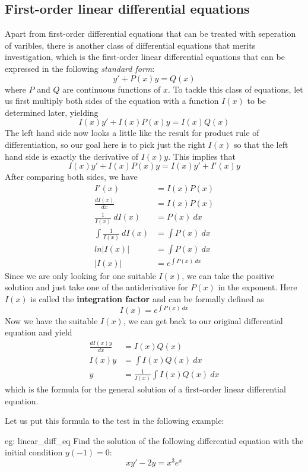 \subsection{First-order linear differential equations}
Apart from first-order differential equations that can be treated with seperation of varibles, there is another class of differential equations that merits investigation, which is the first-order linear differential equations that can be expressed in the following \textit{standard form}:
\[y' + P(x) y = Q(x)\]
where $P$ and $Q$ are continuous functions of $x$.  To tackle this class of equations, let us first multiply both sides of the equation with a function $I(x)$ to be determined later, yielding
\[I(x) y' + I(x)P(x) y = I(x)Q(x)\]
The left hand side now looks a little like the result for product rule of differentiation, so our goal here is to pick just the right $I(x)$ so that the left hand side is exactly the derivative of $I(x)y$.  This implies that
\[I(x) y' + I(x)P(x) y = I(x) y' + I'(x) y\]
After comparing both sides, we have 
\begin{align*}
    I'(x) &= I(x)P(x)\\
    \frac{dI(x)}{dx} &= I(x) P(x)\\
    \frac{1}{I(x)}~dI(x) &= P(x)~dx\\
    \int \frac{1}{I(x)}~dI(x) &= \int P(x)~dx\\
    ln |I(x)| &= \int P(x)~dx\\
    |I(x)| &= e^{\int P(x)~dx}
\end{align*}
Since we are only looking for one suitable $I(x)$, we can take the positive solution and just take one of the antiderivative for $P(x)$ in the exponent.  Here $I(x)$ is called the \textbf{integration factor} and can be formally defined as 
\[I(x) = e^{\int P(x)~dx}\]
Now we have the suitable $I(x)$, we can get back to our original differential equation and yield
\begin{align*}
    \frac{dI(x)y}{dx} &= I(x)Q(x)\\
    I(x)y &= \int I(x)Q(x)~dx\\
    y &= \frac{1}{I(x)} \int I(x)Q(x)~dx
\end{align*}
which is the formula for the general solution of a first-order linear differential equation. 

Let us put this formula to the test in the following example:

\begin{eg}[]{eg: linear_diff_eq}
    Find the solution of the following differential equation with the initial condition $y(-1) = 0$:
    \[xy' - 2y = x^3e^x\]
\end{eg}

